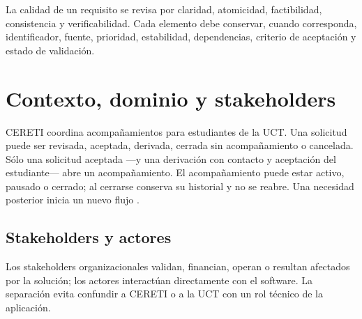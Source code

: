 \documentclass[10pt,a4paper,oneside]{article}
\begin{document}
La calidad de un requisito se revisa por claridad, atomicidad, factibilidad, consistencia y verificabilidad. Cada elemento debe conservar, cuando corresponda, identificador, fuente, prioridad, estabilidad, dependencias, criterio de aceptación y estado de validación.
\section{Contexto, dominio y stakeholders}

CERETI coordina acompañamientos para estudiantes de la UCT. Una solicitud puede ser revisada, aceptada, derivada, cerrada sin acompañamiento o cancelada. Sólo una solicitud aceptada ---y una derivación con contacto y aceptación del estudiante--- abre un acompañamiento. El acompañamiento puede estar activo, pausado o cerrado; al cerrarse conserva su historial y no se reabre. Una necesidad posterior inicia un nuevo flujo \citep{context,especificacion}.

\begin{center}
\end{center}

\subsection{Stakeholders y actores}

Los stakeholders organizacionales validan, financian, operan o resultan afectados por la solución; los actores interactúan directamente con el software. La separación evita confundir a CERETI o a la UCT con un rol técnico de la aplicación.
\end{document}
